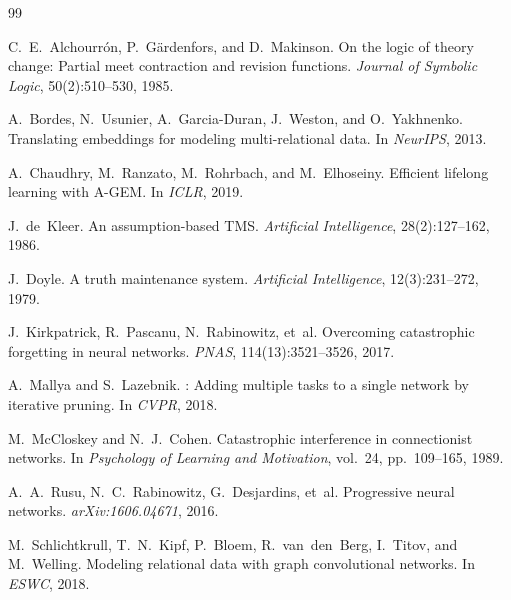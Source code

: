 \documentclass[11pt,a4paper]{article}
\theoremstyle{definition}
\begin{document}

\begin{thebibliography}{99}

C.~E.~Alchourr\'{o}n, P.~G\"ardenfors, and D.~Makinson.
\newblock On the logic of theory change: Partial meet contraction and revision functions.
\newblock \emph{Journal of Symbolic Logic}, 50(2):510--530, 1985.

A.~Bordes, N.~Usunier, A.~Garcia-Duran, J.~Weston, and O.~Yakhnenko.
\newblock Translating embeddings for modeling multi-relational data.
\newblock In \emph{NeurIPS}, 2013.

A.~Chaudhry, M.~Ranzato, M.~Rohrbach, and M.~Elhoseiny.
\newblock Efficient lifelong learning with {A-GEM}.
\newblock In \emph{ICLR}, 2019.

J.~de~Kleer.
\newblock An assumption-based {TMS}.
\newblock \emph{Artificial Intelligence}, 28(2):127--162, 1986.

J.~Doyle.
\newblock A truth maintenance system.
\newblock \emph{Artificial Intelligence}, 12(3):231--272, 1979.

J.~Kirkpatrick, R.~Pascanu, N.~Rabinowitz, et~al.
\newblock Overcoming catastrophic forgetting in neural networks.
\newblock \emph{PNAS}, 114(13):3521--3526, 2017.

A.~Mallya and S.~Lazebnik.
: Adding multiple tasks to a single network by iterative pruning.
\newblock In \emph{CVPR}, 2018.

M.~McCloskey and N.~J.~Cohen.
\newblock Catastrophic interference in connectionist networks.
\newblock In \emph{Psychology of Learning and Motivation}, vol.~24, pp.\ 109--165, 1989.

A.~A.~Rusu, N.~C.~Rabinowitz, G.~Desjardins, et~al.
\newblock Progressive neural networks.
\newblock \emph{arXiv:1606.04671}, 2016.

M.~Schlichtkrull, T.~N.~Kipf, P.~Bloem, R.~van~den~Berg, I.~Titov, and M.~Welling.
\newblock Modeling relational data with graph convolutional networks.
\newblock In \emph{ESWC}, 2018.


\end{thebibliography}
\end{document}
